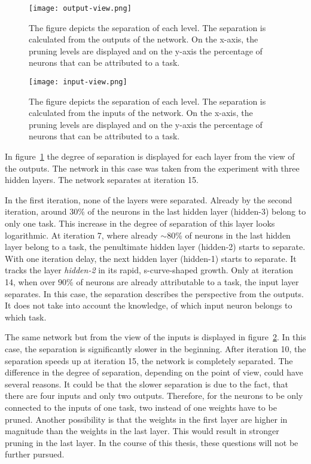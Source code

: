 \begin{figure}[ht]
    \centering
    \texttt{[image: output-view.png]}
    \caption{
    The figure depicts the separation of each level.
    The separation is calculated from the outputs of the network.
    On the x-axis, the pruning levels are displayed and on the y-axis the percentage of neurons that can be attributed to a task.
    }\label{fig:outview}
\end{figure}

\begin{figure}[ht]
    \centering
    \texttt{[image: input-view.png]}
    \caption{    
    The figure depicts the separation of each level.
    The separation is calculated from the inputs of the network.
    On the x-axis, the pruning levels are displayed and on the y-axis the percentage of neurons that can be attributed to a task.
    }\label{fig:inview}
\end{figure}

In figure~\ref{fig:outview} the degree of separation is displayed for each layer from the view of the outputs.
The network in this case was taken from the experiment with three hidden layers.
The network separates at iteration 15.

In the first iteration, none of the layers were separated.
Already by the second iteration, around $30$\% of the neurons in the last hidden layer (hidden-3) belong to only one task.
This increase in the degree of separation of this layer looks logarithmic.
At iteration 7, where already $\sim80$\% of neurons in the last hidden layer belong to a task, the penultimate hidden layer (hidden-2) starts to separate.
With one iteration delay, the next hidden layer (hidden-1) starts to separate.
It tracks the layer \textit{hidden-2} in its rapid, s-curve-shaped growth.
Only at iteration 14, when over $90$\% of neurons are already attributable to a task, the input layer separates.
In this case, the separation describes the perspective from the outputs.
It does not take into account the knowledge, of which input neuron belongs to which task.

The same network but from the view of the inputs is displayed in figure~\ref{fig:inview}.
In this case, the separation is significantly slower in the beginning.
After iteration 10, the separation speeds up at iteration 15, the network is completely separated.
The difference in the degree of separation, depending on the point of view, could have several reasons.
It could be that the slower separation is due to the fact, that there are four inputs and only two outputs.
Therefore, for the neurons to be only connected to the inputs of one task, two instead of one weights have to be pruned.
Another possibility is that the weights in the first layer are higher in magnitude than the weights in the last layer.
This would result in stronger pruning in the last layer.
In the course of this thesis, these questions will not be further pursued.




